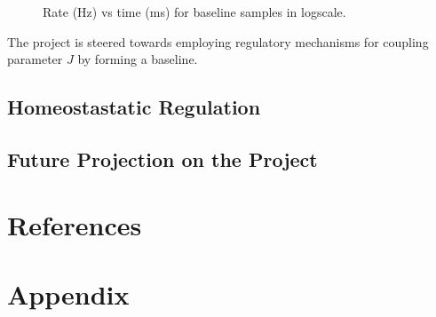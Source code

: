 \documentclass[letterpaper,12pt]{article}
\begin{document}
\begin{figure}[htbp] 
    \caption{Rate (Hz) vs time (ms) for baseline samples in logscale.}
    \label{ratevstime}
\end{figure}

The project is steered towards employing regulatory mechanisms for coupling parameter $J$ by forming a baseline.


\subsection{Homeostastatic Regulation}
\subsection{Future Projection on the Project}

\section{References}


\section{Appendix}
\end{document}
